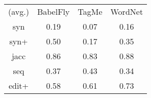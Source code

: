 \begin{tabular}{cccc}
(avg.) & BabelFly & TagMe & WordNet\\ 
syn & 0.19 & 0.07 & 0.16\\ 
syn+ & 0.50 & 0.17 & 0.35\\ 
jacc & 0.86 & 0.83 & 0.88\\ 
seq & 0.37 & 0.43 & 0.34\\ 
edit+ & 0.58 & 0.61 & 0.73
\end{tabular}